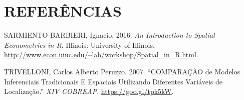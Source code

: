 \documentclass[12pt,]{article}
\begin{document}
\section*{REFERÊNCIAS}\label{referencias}

\hypertarget{refs}{}
\hypertarget{ref-sarmiento-barbieri}{}
SARMIENTO-BARBIERI, Ignacio. 2016. \emph{An Introduction to Spatial
Econometrics in R}. Illinois: University of Illinois.
\url{http://www.econ.uiuc.edu/~lab/workshop/Spatial_in_R.html}.

\hypertarget{ref-trivelloni07}{}
TRIVELLONI, Carlos Alberto Peruzzo. 2007. ``COMPARAÇÃO de Modelos
Inferenciais Tradicionais E Espaciais Utilizando Diferentes Variáveis de
Localização.'' \emph{XIV COBREAP}. \url{https://goo.gl/tpk5kW}.
\end{document}
